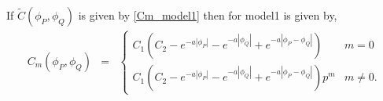 
If $\tilde{C}(\phi_P, \phi_Q)$ is  given by \eqref{Cm_model1} then \Cm for model1 is given by,
\begin{eqnarray*}
	C_m(\phi_P, \phi_Q) &=& \left\{ \begin{array}{ll}
	C_1\left(C_2 - e^{-a|\phi_P|} - e^{-a|\phi_Q|} + e^{-a|\phi_P - \phi_Q|}\right)     & m = 0 \\
	C_1\left(C_2 - e^{-a|\phi_P|} - e^{-a|\phi_Q|} + e^{-a|\phi_P - \phi_Q|}\right)p^m  & m \ne 0.
	\end{array}
	\right.
\end{eqnarray*}




%
